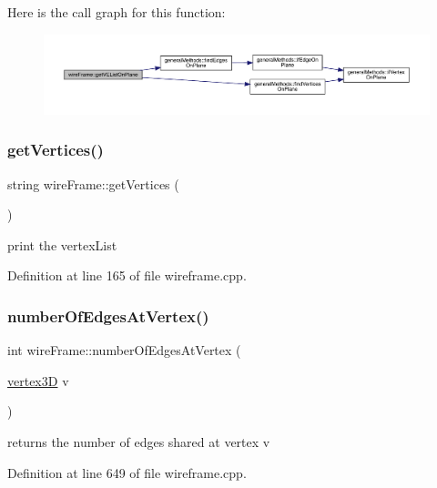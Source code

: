 Here is the call graph for this function\+:
\nopagebreak
\begin{figure}[H]
\begin{center}
\leavevmode
\includegraphics[width=350pt]{classwire_frame_acdcde71a2d420de040065d6db4ad334d_cgraph}
\end{center}
\end{figure}
\mbox{\label{classwire_frame_aa90f66614bc9fe0616cc433d593f0241}} 
\subsubsection{\texorpdfstring{get\+Vertices()}{getVertices()}}
{\footnotesize\ttfamily string wire\+Frame\+::get\+Vertices (\begin{DoxyParamCaption}{ }\end{DoxyParamCaption})}

print the vertex\+List

Definition at line 165 of file wireframe.\+cpp.

\mbox{\label{classwire_frame_a0843bbf4ca224f42f9191ef5b1263c36}} 
\subsubsection{\texorpdfstring{number\+Of\+Edges\+At\+Vertex()}{numberOfEdgesAtVertex()}}
{\footnotesize\ttfamily int wire\+Frame\+::number\+Of\+Edges\+At\+Vertex (\begin{DoxyParamCaption}\item[{\mbox{\hyperlink{structvertex3_d}{vertex3D}}}]{v }\end{DoxyParamCaption})}

returns the number of edges shared at vertex v 

Definition at line 649 of file wireframe.\+cpp.

